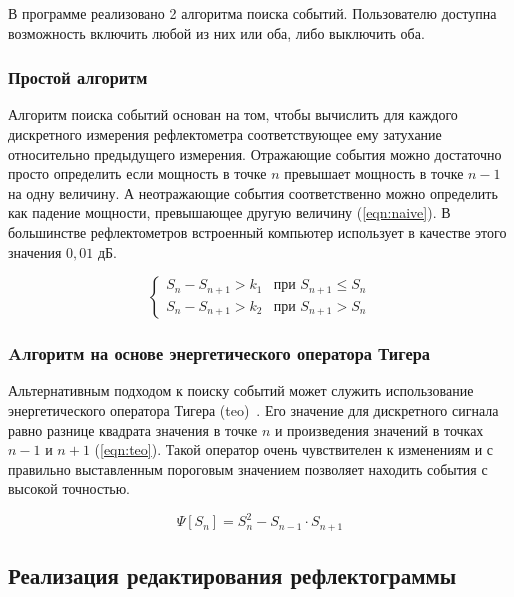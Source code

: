 В программе реализовано 2 алгоритма поиска событий. Пользователю доступна возможность включить любой из них или оба, либо выключить оба.

\subsubsection{Простой алгоритм} \label{простой_алгоритм}

Алгоритм поиска событий основан на том, чтобы вычислить для каждого дискретного измерения рефлектометра соответствующее ему затухание относительно предыдущего измерения. Отражающие события можно достаточно просто определить если мощность в точке $n$ превышает мощность в точке $n-1$ на одну величину. А неотражающие события соответственно можно определить как падение мощности, превышающее другую величину (\ref{eqn:naive}). В большинстве рефлектометров встроенный компьютер использует в качестве этого значения $0,01 \text{ дБ}$.

\begin{equation}
  \label{eqn:naive}
  \left\{
    \begin{array}{ll}
      S_n - S_{n+1} > k_1 & \text{при } S_{n+1} \leqslant S_n \\
      S_n - S_{n+1} > k_2 & \text{при } S_{n+1} > S_n
    \end{array}
  \right.
\end{equation}

\subsubsection{Aлгоритм на основе энергетического оператора Тигера} \label{тео_алгоритм}

Альтернативным подходом к поиску событий может служить использование энергетического оператора Тигера (\acrshort{teo})~\cite{lima:teo}. Его значение для дискретного сигнала равно разнице квадрата значения в точке $n$ и произведения значений в точках $n-1$ и $n+1$ (\ref{eqn:teo}). Такой оператор очень чувствителен к изменениям и с правильно выставленным пороговым значением позволяет находить события с высокой точностью.

\begin{equation}
  \label{eqn:teo}
  \Psi[S_n] = S_n^2-S_{n-1}\cdot S_{n+1}
\end{equation}

\subsection{Реализация редактирования рефлектограммы}

